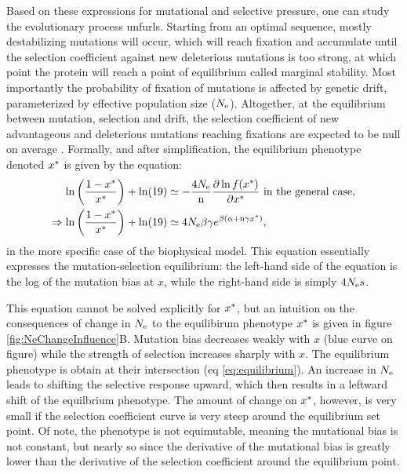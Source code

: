 \documentclass{article}
\begin{document}
	Based on these expressions for mutational and selective pressure, one can study the evolutionary process unfurls.
	Starting from an optimal sequence, mostly destabilizing mutations will occur, which will reach fixation and accumulate until the selection coefficient against new deleterious mutations is too strong, at which point the protein will reach a point of equilibrium called marginal stability.
	Most importantly the probability of fixation of mutations is affected by genetic drift, parameterized by effective population size ($N_{\mathrm{e}}$).
	Altogether, at the equilibrium between mutation, selection and drift, the selection coefficient of new advantageous and deleterious mutations reaching fixations are expected to be null on average \cite{Goldstein2013}.
	Formally, and after simplification, the equilibrium phenotype denoted $x^{*}$ is given by the equation:
	\begin{align}
		\ln \left( \frac{1 - x^{*}}{x^{*}} \right) + \ln (19) & \simeq - \frac{4N_{\mathrm{e}}}{\text{n}} \frac{ \partial \ln f(x^{*}) }{\partial {x^{*}}} \text{ in the general case,} \\
		\Rightarrow \ln \left( \frac{1 - x^{*}}{x^{*}} \right) + \ln (19) & \simeq 4N_{\mathrm{e}} \beta \gamma e^{\beta (\alpha + \text{n} \gamma x^{*})} \text{,} \label{eq:equilibrium}
	\end{align}
	in the more specific case of the biophysical model. This equation essentially expresses the mutation-selection equilibrium: the left-hand side of the equation is the log of the mutation bias at $x$, while the right-hand side is simply $4 N_{\mathrm{e}} s$.
	
	This equation cannot be solved explicitly for $x^{*}$, but an intuition on the consequences of change in $N_{\mathrm{e}}$ to the equilibirum phenotype $x^{*}$ is given in figure \ref{fig:NeChangeInfluence}B.
	Mutation bias decreases weakly with $x$ (blue curve on figure) while the strength of selection increases sharply with $x$.
	The equilibrium phenotype is obtain at their intersection (eq \ref{eq:equilibrium}).
	An increase in $N_{\mathrm{e}}$ leads to shifting the selective response upward, which then results in a leftward shift of the equilbrium phenotype. 
	The amount of change on $x^{*}$, however, is very small if the selection coefficient curve is very steep around the equilibrium set point.
	Of note, the phenotype is not equimutable, meaning the mutational bias is not constant, but nearly so since the derivative of the mutational bias is greatly lower than the derivative of the selection coefficient around the equilibrium point.
	
\end{document}
